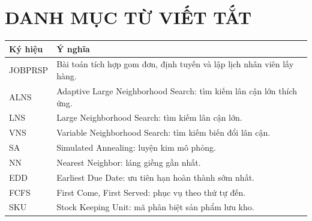 \documentclass[12pt,a4paper]{article}
\theoremstyle{plain} %
\theoremstyle{plain} %
\theoremstyle{plain} %
\theoremstyle{nonumberplain}  %
\numberwithin{equation}{section}
\numberwithin{figure}{section}
\numberwithin{table}{section}
\begin{document}
\pagestyle{fancy}
\setcounter{page}{1}
\hypersetup{pageanchor=true,linkcolor=black}

\section*{DANH MỤC TỪ VIẾT TẮT}
\begin{tabularx}{\linewidth}{lX}
\toprule
Ký hiệu & Ý nghĩa \\
\midrule
JOBPRSP & Bài toán tích hợp gom đơn, định tuyến và lập lịch nhân viên lấy hàng. \\
ALNS & Adaptive Large Neighborhood Search: tìm kiếm lân cận lớn thích ứng. \\
LNS & Large Neighborhood Search: tìm kiếm lân cận lớn. \\
VNS & Variable Neighborhood Search: tìm kiếm biến đổi lân cận. \\
SA & Simulated Annealing: luyện kim mô phỏng. \\
NN & Nearest Neighbor: láng giềng gần nhất. \\
EDD & Earliest Due Date: ưu tiên hạn hoàn thành sớm nhất. \\
FCFS & First Come, First Served: phục vụ theo thứ tự đến. \\
SKU & Stock Keeping Unit: mã phân biệt sản phẩm lưu kho. \\
\bottomrule
\end{tabularx}
\clearpage

\renewcommand{\contentsname}{Mục lục}
\tableofcontents

\newpage 

\renewcommand{\listfigurename}{Danh sách hình ảnh}
\listoffigures

\clearpage
\renewcommand{\listtablename}{Danh sách bảng}
\listoftables

\clearpage

\clearpage

\clearpage

\clearpage

\clearpage

\clearpage
{}
{}

\end{document}
